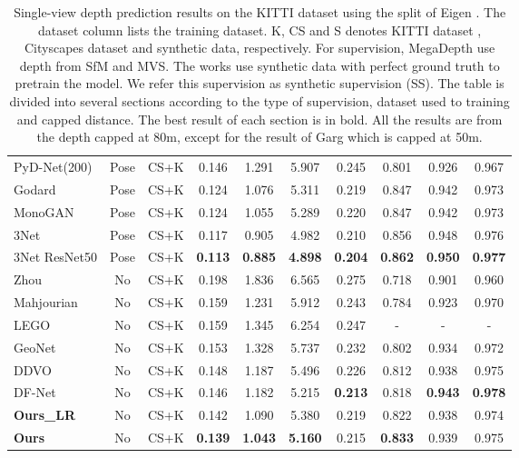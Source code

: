\documentclass[10pt,twocolumn,letterpaper]{article}
\begin{document}
\begin{table*}
\begin{center}
\begin{tabular}{l|c|c|c|c|c|c|c|c|c}
			PyD-Net(200) \cite{poggi2018towards} & Pose & CS+K & 0.146 & 1.291 & 5.907 & 0.245 & 0.801 & 0.926 & 0.967 \\
			Godard \etal \cite{godard2017unsupervised} & Pose & CS+K & 0.124 & 1.076 & 5.311 &  0.219 & 0.847 & 0.942 & 0.973 \\
			MonoGAN \cite{aleotti2018generative} & Pose & CS+K & 0.124 & 1.055 & 5.289 & 0.220 & 0.847 & 0.942 & 0.973 \\
			3Net \cite{poggi2018learning} & Pose & CS+K & 0.117 & 0.905 & 4.982 & 0.210 & 0.856 & 0.948 & 0.976 \\
			3Net ResNet50 \cite{poggi2018learning} & Pose & CS+K & \textbf{0.113} & \textbf{0.885} & \textbf{4.898} & \textbf{0.204} & \textbf{0.862} & \textbf{0.950} & \textbf{0.977} \\
			\hline
			Zhou \etal \cite{zhou2017unsupervised} & No & CS+K  & 0.198 & 1.836 & 6.565 & 0.275 & 0.718 & 0.901 & 0.960 \\
			Mahjourian \etal \cite{mahjourian2018unsupervised} & No & CS+K & 0.159 & 1.231 & 5.912 & 0.243 & 0.784 & 0.923 & 0.970 \\
			LEGO \cite{LEGO} & No & CS+K & 0.159 & 1.345 & 6.254 & 0.247 & - & - & - \\
			GeoNet \cite{yin2018geonet} & No & CS+K & 0.153 & 1.328 & 5.737 & 0.232 & 0.802 & 0.934 & 0.972 \\			
			DDVO \cite{wang2018learning} & No & CS+K & 0.148 & 1.187 & 5.496 & 0.226 & 0.812 & 0.938 & 0.975 \\	
			DF-Net \cite{zou2018df} & No & CS+K & 0.146 & 1.182 & 5.215 & \textbf{0.213} & 0.818 & \textbf{0.943} & \textbf{0.978} \\	
			\textbf{Ours\_LR}           & No & CS+K & 0.142 & 1.090 & 5.380 & 0.219 & 0.822 & 0.938 & 0.974 \\
			\textbf{Ours}       & No & CS+K & \textbf{0.139} & \textbf{1.043} & \textbf{5.160} & 0.215 & \textbf{0.833} & 0.939 & 0.975 \\
			\hline
		\end{tabular}
	\end{center}
	\caption{Single-view depth prediction results on the KITTI dataset using the split of Eigen \etal \cite{EigenDepth}. The dataset column lists the training dataset. K, CS and S denotes KITTI dataset \cite{KITTI}, Cityscapes dataset \cite{cityscapes} and synthetic data, respectively. For supervision, MegaDepth \cite{li2018megadepth} use depth from SfM and MVS. The works  \cite{atapour2018real,guo2018learning} use synthetic data with perfect ground truth to pretrain the model. We refer this supervision as synthetic supervision (SS).   The table is divided into several sections according to the type of supervision, dataset used to training and capped distance. The best result of each section is in bold. All the results are from the depth capped at 80m, except for the result of Garg \etal \cite{garg2016unsupervised} which is capped at 50m.}\label{table:kitti}
\end{table*}
\end{document}
